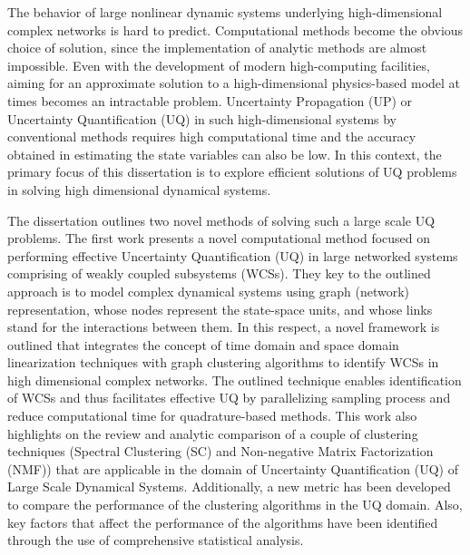 The behavior of large nonlinear dynamic systems underlying high-dimensional complex networks is hard to predict. Computational methods become the obvious choice of solution, since the implementation of analytic methods are almost impossible. Even with the development of modern high-computing facilities, aiming for an approximate solution to a high-dimensional physics-based model at times becomes an intractable problem. Uncertainty Propagation (UP) or Uncertainty Quantification (UQ) in such high-dimensional systems by conventional methods requires high computational time and the accuracy obtained in estimating the state variables can also be low. In this context, the primary focus of this dissertation is to explore efficient solutions of UQ problems in solving high dimensional dynamical systems. 

The dissertation outlines two novel methods of solving such a large scale UQ problems. The first work presents a novel computational method focused on performing effective Uncertainty Quantification (UQ) in large networked systems comprising of weakly coupled subsystems (WCSs). They key to the outlined approach is to model complex dynamical systems using graph (network) representation, whose nodes represent the state-space units, and whose links stand for the interactions between them. In this respect, a novel framework is outlined that integrates the concept of time domain and space domain linearization techniques with graph clustering algorithms to identify WCSs in high dimensional complex networks. The outlined technique enables identification of WCSs and thus facilitates effective UQ by parallelizing sampling process and reduce computational time for quadrature-based methods.  This work also highlights on the review and analytic comparison of a couple of clustering techniques (Spectral Clustering (SC) and Non-negative Matrix Factorization (NMF)) that are applicable in the domain of Uncertainty Quantification (UQ) of Large Scale Dynamical Systems. Additionally, a new metric has been developed to compare the performance of the clustering algorithms in the UQ domain. Also, key factors that affect the performance of the algorithms have been identified through the use of comprehensive statistical analysis.

